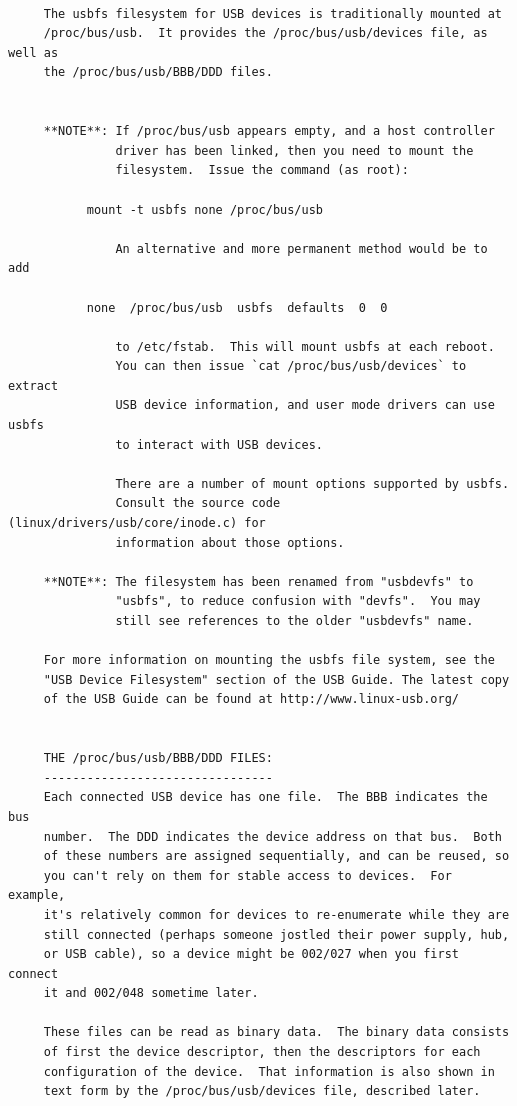 {{{{{{{{{{{{{{{{{\begin{verbatim}
     
     The usbfs filesystem for USB devices is traditionally mounted at
     /proc/bus/usb.  It provides the /proc/bus/usb/devices file, as well as
     the /proc/bus/usb/BBB/DDD files.
     
     
     **NOTE**: If /proc/bus/usb appears empty, and a host controller
               driver has been linked, then you need to mount the
               filesystem.  Issue the command (as root):
     
           mount -t usbfs none /proc/bus/usb
     
               An alternative and more permanent method would be to add
     
           none  /proc/bus/usb  usbfs  defaults  0  0
     
               to /etc/fstab.  This will mount usbfs at each reboot.
               You can then issue `cat /proc/bus/usb/devices` to extract
               USB device information, and user mode drivers can use usbfs
               to interact with USB devices.
     
               There are a number of mount options supported by usbfs.
               Consult the source code (linux/drivers/usb/core/inode.c) for
               information about those options.
     
     **NOTE**: The filesystem has been renamed from "usbdevfs" to
               "usbfs", to reduce confusion with "devfs".  You may
               still see references to the older "usbdevfs" name.
     
     For more information on mounting the usbfs file system, see the
     "USB Device Filesystem" section of the USB Guide. The latest copy
     of the USB Guide can be found at http://www.linux-usb.org/
     
     
     THE /proc/bus/usb/BBB/DDD FILES:
     --------------------------------
     Each connected USB device has one file.  The BBB indicates the bus
     number.  The DDD indicates the device address on that bus.  Both
     of these numbers are assigned sequentially, and can be reused, so
     you can't rely on them for stable access to devices.  For example,
     it's relatively common for devices to re-enumerate while they are
     still connected (perhaps someone jostled their power supply, hub,
     or USB cable), so a device might be 002/027 when you first connect
     it and 002/048 sometime later.
     
     These files can be read as binary data.  The binary data consists
     of first the device descriptor, then the descriptors for each
     configuration of the device.  That information is also shown in
     text form by the /proc/bus/usb/devices file, described later.
     

\end{verbatim}}}}}}}}}}}}}}}}}}
